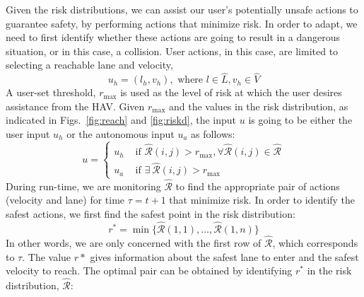 \documentclass[letterpaper, 10 pt, conference]{ieeeconf}  %
\newcommand\NB[1]{$\spadesuit$\footnote{NB: #1}}
\begin{document}
Given the risk distributions, we can assist our user's potentially unsafe actions to guarantee safety, by performing actions that minimize risk. In order to adapt, we need to first identify whether these actions are going to result in a dangerous situation, or in this case, a collision. User actions, in this case, are limited to selecting a reachable lane and velocity,
\begin{equation}
u_h = (l_h,v_h), \text{ where } l\in\hat{L}, v_h\in\hat{V}
\end{equation}
A user-set threshold, $r_\max$ is used as the level of risk at which the user desires assistance from the HAV. Given $r_\max$ and the values in the risk distribution, as indicated in Figs.~\ref{fig:reach} and \ref{fig:riskd}, the input $u$ is going to be either the user input $u_h$ or the autonomous input $u_a$ as follows:
\begin{equation} \label{eq:inputctrl}
    u = \begin{cases}
    u_h & \text{ if } \hat{\mathcal{R}}(i,j) > r_\max, \forall\hat{\mathcal{R}}(i,j)\in\hat{\mathcal{R}} \\
    u_a & \text{ if } \exists~\hat{\mathcal{R}}(i,j) > r_\max
    \end{cases}
\end{equation}
During run-time, we are monitoring $\hat{\mathcal{R}}$ to find the appropriate pair of actions (velocity and lane) for time $\tau = t+1$ that minimize risk. In order to identify the safest actions, we first find the safest point in the risk distribution:
\begin{equation} \label{eq:optpt}
  r^* = \min\{\hat{\mathcal{R}}(1,1),\ldots,\hat{\mathcal{R}}(1,n)\}  
\end{equation}
In other words, we are only concerned with the first row of $\hat{\mathcal{R}}$, which corresponds to $\tau$.
The value $r*$ gives information about the safest lane to enter and the safest velocity to reach. The optimal pair can be obtained by identifying $r^*$ in the risk distribution, $\hat{\mathcal{R}}$:
\end{document}
